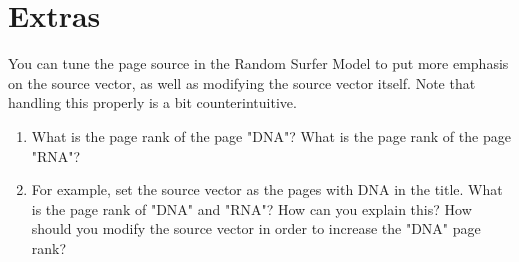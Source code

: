 \documentclass[mathserif, 11pt,c]{article}
\begin{document}
\section{Extras}

You can tune the page source in the Random Surfer Model to put more emphasis on the source vector, as well as modifying the source vector itself.
Note that handling this properly is a bit counterintuitive.

\begin{enumerate}[label=\textbf{Q\thesection.\arabic*}]
	\item What is the page rank of the page "DNA"? What is the page rank of the page "RNA"?
	\item For example, set the source vector as the pages with DNA in the title. What is the page rank of "DNA" and "RNA"? How can you explain this? How should you modify the source vector in order to increase the "DNA" page rank?
\end{enumerate}
	

%
\end{document}
